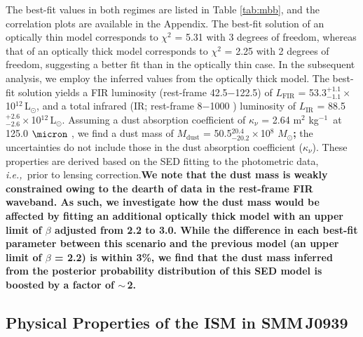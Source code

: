\documentclass[iop, revtex4]{emulateapj}
\newcommand{\Msun}{\mbox{$M_{\odot}$}}
\newcommand{\Lsun}{\mbox{L$_{\odot}$}}
\newcommand{\ie}{{\sl i.e.,~}}
\newcommand{\pmOne}{\mbox{$^{-1}$}}
\begin{document}

The best-fit values in both regimes are listed in Table \ref{tab:mbb}, and the correlation plots are available in the Appendix. The best-fit solution of an optically thin
model corresponds to $\chi^2$ = 5.31 with 3 degrees of freedom, whereas that of an optically thick model
corresponds to $\chi^2$ = 2.25 with 2 degrees of freedom, suggesting a better fit than in the optically thin
case. In the subsequent analysis, we employ the inferred values from the optically thick model.
The best-fit solution yields a FIR luminosity (rest-frame 42.5$-$122.5\micron) of $L_\textrm{FIR}$ = 53.3$^{+1.1}_{-1.1}$\,$\times$\,10$^{12}$\,\Lsun, and a total infrared (IR; rest-frame 8$-$1000 \micron) luminosity of $L_\textrm{IR}$ = 88.5$^{+2.6}_{-2.6}$\,$\times$\,10$
^{12}$\,\Lsun. Assuming a dust absorption coefficient of $\kappa_{\nu}$ = 2.64\,\,m$^2$\,\,kg\pmOne\ at 125.0\,\,$
\micron$ \citep{Dunne03a}, we find a dust mass of $M_\textrm{dust}$ = 50.5$^{20.4}_{-20.2}\times$10$^8$\,\,\Msun{\bf ;} the uncertainties do not include those in the dust absorption coefficient ($\kappa_{\nu}$). These properties are derived based on the SED fitting to the photometric data, \ie prior
to lensing correction.{\bf We note that the dust mass is weakly constrained owing to the dearth of data in the {\bf rest-frame} FIR waveband. As such, we investigate how the dust mass would be affected by fitting an additional optically thick model with an upper limit of 
 $\beta$ adjusted from 2.2 to 3.0. While the difference in each best-fit parameter between this scenario and the previous model (an upper limit of $\beta$ = 2.2) is within 3\%, we find that the dust mass inferred from the posterior probability distribution of this SED model is boosted by a factor of $\sim$\,2.}
\subsection{Physical Properties of the ISM in SMM\,J0939}
\end{document}
